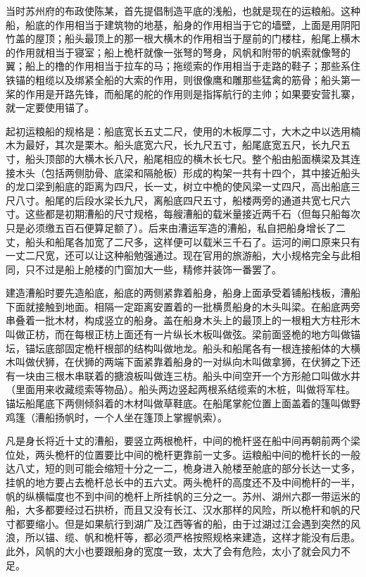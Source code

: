 \documentclass[12pt,UTF8]{ctexbook}
\begin{document}
当时苏州府的布政使陈某，首先提倡制造平底的浅船，也就是现在的运粮船。这种船，船底的作用相当于建筑物的地基，船身的作用相当于它的墙壁，上面是用阴阳竹盖的屋顶；船头最顶上的那一根大横木的作用相当于屋前的门楼柱，船尾上横木的作用就相当于寝室；船上桅杆就像一张弩的弩身，风帆和附带的帆索就像弩的翼；船上的橹的作用相当于拉车的马；拖缆索的作用相当于走路的鞋子；那些系住铁锚的粗缆以及绑紧全船的大索的作用，则很像鹰和雕那些猛禽的筋骨；船头第一桨的作用是开路先锋，而船尾的舵的作用则是指挥航行的主帅；如果要安营扎寨，就一定要使用锚了。

起初运粮船的规格是：船底宽长五丈二尺，使用的木板厚二寸，大木之中以选用楠木为最好，其次是栗木。船头底宽六尺，长九尺五寸，船尾底宽五尺，长九尺五寸，船头顶部的大横木长八尺，船尾相应的横木长七尺。整个船由船面横梁及其连接木头（包括两侧肋骨、底梁和隔舱板）形成的构架一共有十四个，其中接近船头的龙口梁到船底的距离为四尺，长一丈，树立中桅的使风梁一丈四尺，高出船底三尺八寸。船尾的后段水梁长九尺，离船底四尺五寸，船楼两旁的通道共宽七尺六寸。这些都是初期漕船的尺寸规格，每艘漕船的载米量接近两千石（但每只船每次只是必须缴五百石便算足额了）。后来由漕运军造的漕船，私自把船身增长了二丈，船头和船尾各加宽了二尺多，这样便可以载米三千石了。运河的闸口原来只有一丈二尺宽，还可以让这种船勉强通过。现在官用的旅游船，大小规格完全与此相同，只不过是船上舱楼的门窗加大一些，精修并装饰一番罢了。

建造漕船时要先造船底，船底的两侧紧靠着船身，船身上面承受着铺船栈板，漕船下面就接触到地面。相隔一定距离安置着的一批横贯船身的木头叫梁。在船底两旁串叠着一批木材，构成竖立的船身。盖在船身木头上的最顶上的一根粗大方柱形木叫做正枋，而在每根正枋上面还有一片纵长木板叫做弦。梁前面竖桅的地方叫做锚坛，锚坛底部固定桅杆根部的结构叫做地龙。船头和船尾各有一根连接船体的大横木叫做伏狮，在伏狮的两端下面紧靠着船身的一对纵向木叫做拿狮，在伏狮之下还有一块由三根木串联着的搪浪板叫做连三枋。船头中间空开一个方形舱口叫做水井（里面用来收藏缆索等物品）。船头两边竖起两根系结缆索的木桩，叫做将军柱。锚坛船尾底下两侧倾斜着的木材叫做草鞋底。在船尾掌舵位置上面盖着的篷叫做野鸡篷（漕船扬帆时，一个人坐在篷顶上掌握帆索）。

凡是身长将近十丈的漕船，要竖立两根桅杆，中间的桅杆竖在船中间再朝前两个梁位处，两头桅杆的位置要比中间的桅杆更靠前一丈多。运粮船中间的桅杆长的一般达八丈，短的则可能会缩短十分之一二，桅身进入舱楼至舱底的部分长达一丈多，挂帆的地方要占去桅杆总长中的五六丈。两头桅杆的高度还不及中间桅杆的一半，帆的纵横幅度也不到中间的桅杆上所挂帆的三分之一。苏州、湖州六郡一带运米的船，大多都要经过石拱桥，而且又没有长江、汉水那样的风险，所以桅杆和帆的尺寸都要缩小。但是如果航行到湖广及江西等省的船，由于过湖过江会遇到突然的风浪，所以锚、缆、帆和桅杆等，都必须严格按照规格来建造，这样才能没有后患。此外，风帆的大小也要跟船身的宽度一致，太大了会有危险，太小了就会风力不足。
\end{document}
